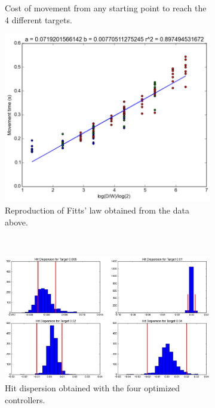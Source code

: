 \begin{figure}[t!]
\begin{subfigure}[t]{0.45\textwidth}
    \caption{Cost of movement from any starting point to reach the 4 different targets.\label{fig:costmap}}
  \end{subfigure}%
  \linebreak
	\centering
  \begin{subfigure}[t]{0.45\textwidth}
    \centering
    \includegraphics[width=0.8\linewidth]{images/fitts.png}
    \caption{Reproduction of Fitts' law obtained from the data above.\label{fig:fitts}}
  \end{subfigure}%
  ~ 
  \begin{subfigure}[t]{0.45\textwidth}
    \centering
    \includegraphics[width=0.9\linewidth]{images/hitdisp.png}
    \caption{Hit dispersion obtained with the four optimized controllers.\label{fig:hitdisp}}
  \end{subfigure}%
  \caption{}
\end{figure}

